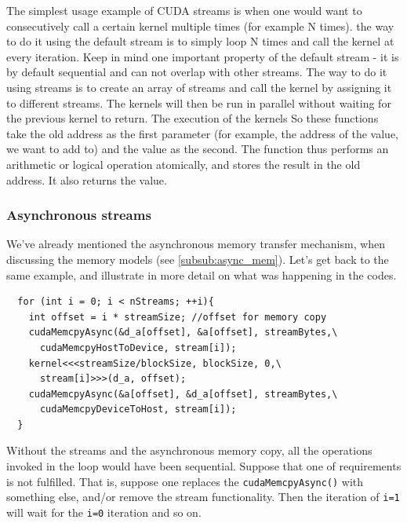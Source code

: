 The simplest usage example of CUDA streams is when one would want to consecutively call a certain kernel multiple times 
(for example N times). 
the way to do it using the default stream is to simply loop N times and call the kernel at every iteration.
Keep in mind one important property of the default stream - it is by default sequential and can not overlap with other streams.
The way to do it using streams is to create an array of streams and call the kernel by assigning it to different streams.
The kernels will then be run in parallel without waiting for the previous kernel to return. The execution of the kernels 
So these functions take the old address as the first parameter (for example, the address of the value, we want to add to) and 
the value as the second. The function thus performs an arithmetic or logical operation atomically, 
and stores the result in the old address. It also returns the value.


\subsubsection{Asynchronous streams}
\label{subsub:async_streams}

We've already mentioned the asynchronous memory transfer mechanism, when discussing the memory models (see \ref{subsub:async_mem}).
Let's get back to the same example, and illustrate in more detail on what was happening in the codes.
\begin{listing}
  \begin{verbatim}
  for (int i = 0; i < nStreams; ++i){
    int offset = i * streamSize; //offset for memory copy 
    cudaMemcpyAsync(&d_a[offset], &a[offset], streamBytes,\
      cudaMemcpyHostToDevice, stream[i]);
    kernel<<<streamSize/blockSize, blockSize, 0,\
      stream[i]>>>(d_a, offset);
    cudaMemcpyAsync(&a[offset], &d_a[offset], streamBytes,\
      cudaMemcpyDeviceToHost, stream[i]);
  }
  \end{verbatim}
  \label{fig:async_mem_streams}
\end{listing}

Without the streams and the asynchronous memory copy, all the operations invoked in the loop would have been sequential. Suppose 
that one of requirements is not fulfilled. That is, suppose one replaces the \verb|cudaMemcpyAsync()| with something else, and/or remove the stream functionality.
Then the iteration of \verb|i=1| will wait for the \verb|i=0| iteration and so on.

